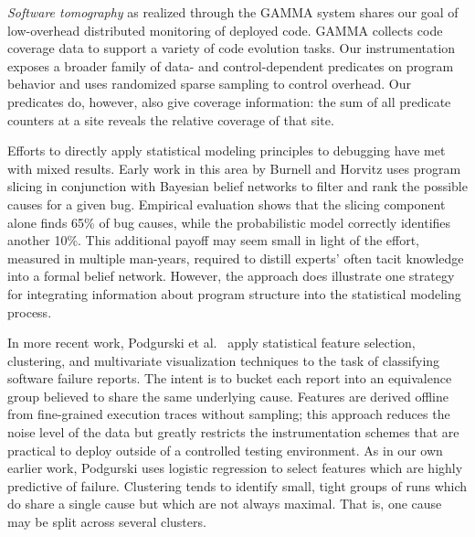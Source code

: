 \documentclass[draft]{sig-alternate}
\newcommand{\termdef}[1]{\emph{#1}}
\begin{document}
\termdef{Software tomography} as realized through the GAMMA system
\cite{PASTE'02*2,Orso:2003:LFDIART} shares our goal of low-overhead
distributed monitoring of deployed code.  GAMMA collects code coverage
data to support a variety of code evolution tasks.  Our
instrumentation exposes a broader family of data- and
control-dependent predicates on program behavior and uses randomized
sparse sampling to control overhead.  Our predicates do, 
however, also give coverage information: the sum of all predicate counters at a site reveals the relative coverage of that site.

Efforts to directly apply statistical modeling principles to debugging
have met with mixed results.  Early work in this area by Burnell and
Horvitz \cite{Burnell:1995:SCM} uses program slicing in conjunction
with Bayesian belief networks to filter and rank the possible causes
for a given bug.  Empirical evaluation shows that the slicing component
alone finds 65\% of bug causes, while the probabilistic model
correctly identifies another 10\%.  This additional payoff may seem
small in light of the effort, measured in multiple
man-years, required to distill experts' often tacit knowledge into a
formal belief network.  However, the approach does illustrate one
strategy for integrating information about program structure into the
statistical modeling process.

In more recent work, Podgurski et al.\ \cite{ICSE`03*465} apply
statistical feature selection, clustering, and multivariate
visualization techniques to the task of classifying software failure
reports.  The intent is to bucket each report into an equivalence
group believed to share the same underlying cause.  Features are
derived offline from fine-grained execution traces without sampling;
this approach reduces the noise level of the data but greatly restricts the
instrumentation schemes that are practical to deploy outside of a
controlled testing environment.  As in our own earlier work, Podgurski
uses logistic regression to select features which are highly
predictive of failure.
Clustering tends to identify small, tight groups of runs which do
share a single cause but which are not always maximal.  That is, one
cause may be split across several clusters.
\end{document}
